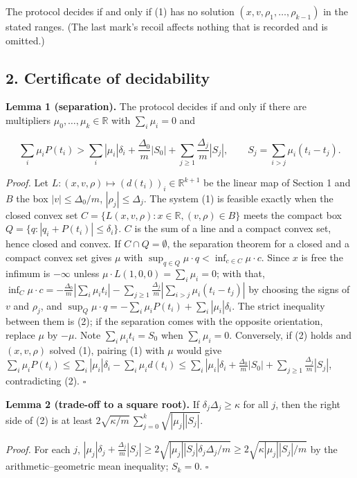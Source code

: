 \documentclass[11pt,a4paper]{article}
\begin{document}
The protocol decides if and only if (1) has no solution
\((x,v,\rho_1,\dots,\rho_{k-1})\) in the stated ranges. (The last mark's
recoil affects nothing that is recorded and is omitted.)

\hypertarget{certificate-of-decidability}{%
\subsection{2. Certificate of
decidability}\label{certificate-of-decidability}}

\textbf{Lemma 1 (separation).} The protocol decides if and only if there
are multipliers \(\mu_0,\dots,\mu_k\in\mathbb R\) with \(\sum_i\mu_i=0\)
and

\[\sum_i\mu_iP(t_i)>\sum_i|\mu_i|\delta_i+\frac{\Delta_0}{m}|S_0|
+\sum_{j\ge1}\frac{\Delta_j}{m}|S_j|,\qquad
S_j=\sum_{i>j}\mu_i(t_i-t_j). \tag{2}\]

\emph{Proof.} Let \(L:(x,v,\rho)\mapsto(d(t_i))_i\in\mathbb R^{k+1}\) be
the linear map of Section 1 and \(B\) the box \(|v|\le\Delta_0/m\),
\(|\rho_j|\le\Delta_j\). The system (1) is feasible exactly when the
closed convex set \(C=\{L(x,v,\rho):x\in\mathbb R,(v,\rho)\in B\}\)
meets the compact box \(Q=\{q:|q_i+P(t_i)|\le\delta_i\}\). \(C\) is the
sum of a line and a compact convex set, hence closed and convex. If
\(C\cap Q=\emptyset\), the separation theorem for a closed and a compact
convex set gives \(\mu\) with
\(\sup_{q\in Q}\mu\cdot q<\inf_{c\in C}\mu\cdot c\). Since \(x\) is free
the infimum is \(-\infty\) unless \(\mu\cdot L(1,0,0)=\sum_i\mu_i=0\);
with that,
\(\inf_C\mu\cdot c=-\frac{\Delta_0}m|\sum_i\mu_it_i|-\sum_{j\ge1}\frac{\Delta_j}m|\sum_{i>j}\mu_i(t_i-t_j)|\)
by choosing the signs of \(v\) and \(\rho_j\), and
\(\sup_Q\mu\cdot q=-\sum_i\mu_iP(t_i)+\sum_i|\mu_i|\delta_i\). The
strict inequality between them is (2); if the separation comes with the
opposite orientation, replace \(\mu\) by \(-\mu\). Note
\(\sum_i\mu_it_i=S_0\) when \(\sum_i\mu_i=0\). Conversely, if (2) holds
and \((x,v,\rho)\) solved (1), pairing (1) with \(\mu\) would give
\(\sum_i\mu_iP(t_i)\le\sum_i|\mu_i|\delta_i-\sum_i\mu_id(t_i) \le\sum_i|\mu_i|\delta_i+\frac{\Delta_0}m|S_0|+\sum_{j\ge1}\frac{\Delta_j}m|S_j|\),
contradicting (2). \(\square\)

\textbf{Lemma 2 (trade-off to a square root).} If
\(\delta_j\Delta_j\ge\kappa\) for all \(j\), then the right side of (2)
is at least \(2\sqrt{\kappa/m}\,\sum_{j=0}^k\sqrt{|\mu_j||S_j|}\).

\emph{Proof.} For each \(j\),
\(|\mu_j|\delta_j+\frac{\Delta_j}m|S_j| \ge2\sqrt{|\mu_j||S_j|\delta_j\Delta_j/m}\ge2\sqrt{\kappa|\mu_j||S_j|/m}\)
by the arithmetic--geometric mean inequality; \(S_k=0\). \(\square\)
\end{document}
